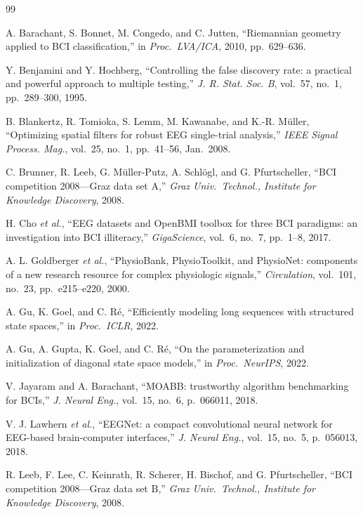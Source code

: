 \documentclass[11pt,a4paper]{article}
\begin{document}
\begin{thebibliography}{99}

A. Barachant, S. Bonnet, M. Congedo, and C. Jutten,
``Riemannian geometry applied to BCI classification,''
in \emph{Proc.\ LVA/ICA}, 2010, pp.\ 629--636.

Y. Benjamini and Y. Hochberg,
``Controlling the false discovery rate: a practical and powerful approach to
multiple testing,''
\emph{J. R. Stat. Soc. B}, vol.~57, no.~1, pp.~289--300, 1995.

B. Blankertz, R. Tomioka, S. Lemm, M. Kawanabe, and K.-R. M\"uller,
``Optimizing spatial filters for robust EEG single-trial analysis,''
\emph{IEEE Signal Process. Mag.}, vol.~25, no.~1, pp.~41--56, Jan.~2008.

C. Brunner, R. Leeb, G. M\"uller-Putz, A. Schl\"ogl, and G. Pfurtscheller,
``BCI competition 2008---Graz data set A,''
\emph{Graz Univ.\ Technol., Institute for Knowledge Discovery}, 2008.

H. Cho \emph{et al.},
``EEG datasets and OpenBMI toolbox for three BCI paradigms: an investigation
into BCI illiteracy,''
\emph{GigaScience}, vol.~6, no.~7, pp.~1--8, 2017.

A. L. Goldberger \emph{et al.},
``PhysioBank, PhysioToolkit, and PhysioNet: components of a new research
resource for complex physiologic signals,''
\emph{Circulation}, vol.~101, no.~23, pp.~e215--e220, 2000.

A. Gu, K. Goel, and C. R\'e,
``Efficiently modeling long sequences with structured state spaces,''
in \emph{Proc.\ ICLR}, 2022.

A. Gu, A. Gupta, K. Goel, and C. R\'e,
``On the parameterization and initialization of diagonal state space models,''
in \emph{Proc.\ NeurIPS}, 2022.

V. Jayaram and A. Barachant,
``MOABB: trustworthy algorithm benchmarking for BCIs,''
\emph{J. Neural Eng.}, vol.~15, no.~6, p.~066011, 2018.

V. J. Lawhern \emph{et al.},
``EEGNet: a compact convolutional neural network for EEG-based
brain-computer interfaces,''
\emph{J. Neural Eng.}, vol.~15, no.~5, p.~056013, 2018.

R. Leeb, F. Lee, C. Keinrath, R. Scherer, H. Bischof, and G. Pfurtscheller,
``BCI competition 2008---Graz data set B,''
\emph{Graz Univ.\ Technol., Institute for Knowledge Discovery}, 2008.


\end{thebibliography}
\end{document}
